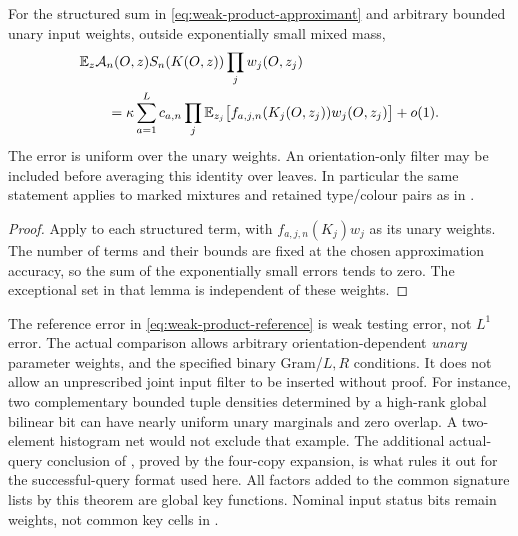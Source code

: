 \begin{corollary}
\label{cor:weak-product-factorized-integration}
For the structured sum in \eqref{eq:weak-product-approximant} and
arbitrary bounded unary input weights, outside exponentially small
mixed mass,
\begin{align}\label{eq:weak-product-factorized-integration}
 &\mathbb E_z\mathcal A_n(O,z)S_n(K(O,z))\prod_jw_j(O,z_j)\notag\\
 &\qquad=
 \kappa\sum_{a=1}^{L}c_{a,n}
       \prod_j\mathbb E_{z_j}
        \bigl[f_{a,j,n}(K_j(O,z_j))w_j(O,z_j)\bigr]+o(1).
\end{align}
The error is uniform over the unary weights. An orientation-only
filter may be included before averaging this identity over leaves.
In particular the same statement applies to marked mixtures and
retained type/colour pairs as in .
\end{corollary}

\begin{proof}
Apply  to each structured term, with
$f_{a,j,n}(K_j)w_j$ as its unary weights. The number of terms and
their bounds are fixed at the chosen approximation accuracy, so the
sum of the exponentially small errors tends to zero. The exceptional
set in that lemma is independent of these weights.
\end{proof}

\begin{remark}
\label{rem:weak-product-filter-class}
The reference error in \eqref{eq:weak-product-reference} is weak
testing error, not $L^1$ error. The actual comparison allows arbitrary
orientation-dependent \emph{unary} parameter weights, and the
specified binary Gram/$L,R$ conditions. It does not allow an
unprescribed joint input filter to be inserted without proof.
For instance, two complementary bounded tuple densities determined
by a high-rank global bilinear bit can have nearly uniform unary
marginals and zero overlap. A two-element histogram net would not
exclude that example. The additional actual-query conclusion of
, proved by the four-copy expansion, is what
rules it out for the successful-query format used here. All factors
added to the common signature lists by this theorem are global key
functions. Nominal input status bits remain weights, not common key
cells in .
\end{remark}
